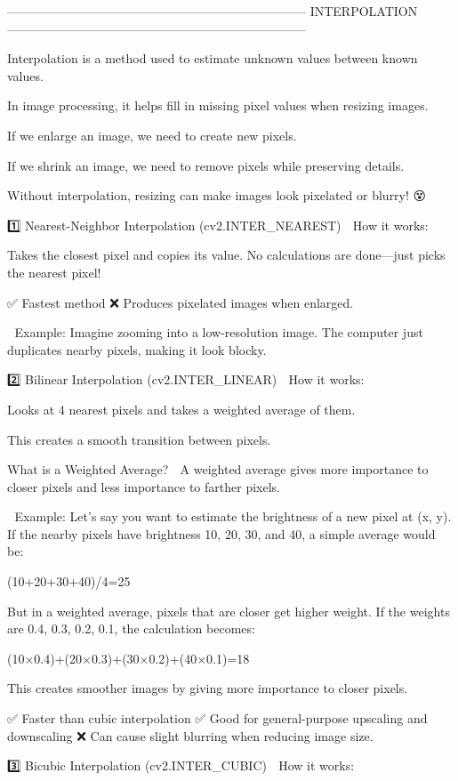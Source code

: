 ------------------------------------------------------------------------
INTERPOLATION 🤔
------------------------------------------------------------------------

Interpolation is a method used to estimate unknown values between known values.

In image processing, it helps fill in missing pixel values when resizing images.

If we enlarge an image, we need to create new pixels.

If we shrink an image, we need to remove pixels while preserving details.

Without interpolation, resizing can make images look pixelated or blurry! 😵

1️⃣ Nearest-Neighbor Interpolation (cv2.INTER_NEAREST)
📌 How it works:

Takes the closest pixel and copies its value.
No calculations are done—just picks the nearest pixel!

✅ Fastest method
❌ Produces pixelated images when enlarged.

🔹 Example:
Imagine zooming into a low-resolution image. The computer just duplicates nearby pixels, making it look blocky.

2️⃣ Bilinear Interpolation (cv2.INTER_LINEAR)
📌 How it works:

Looks at 4 nearest pixels and takes a weighted average of them.

This creates a smooth transition between pixels.

What is a Weighted Average? 🤔
A weighted average gives more importance to closer pixels and less importance to farther pixels.

🔹 Example:
Let’s say you want to estimate the brightness of a new pixel at (x, y).
If the nearby pixels have brightness 10, 20, 30, and 40, a simple average would be:

(10+20+30+40)/4=25

But in a weighted average, pixels that are closer get higher weight.
If the weights are 0.4, 0.3, 0.2, 0.1, the calculation becomes:

(10×0.4)+(20×0.3)+(30×0.2)+(40×0.1)=18

This creates smoother images by giving more importance to closer pixels.

✅ Faster than cubic interpolation
✅ Good for general-purpose upscaling and downscaling
❌ Can cause slight blurring when reducing image size.

3️⃣ Bicubic Interpolation (cv2.INTER_CUBIC)
📌 How it works:

